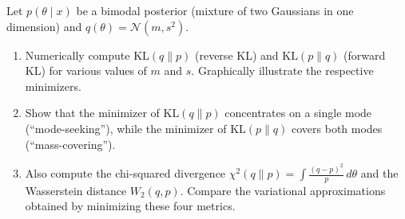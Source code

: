 \begin{exercise}
Let $p(\theta \mid x)$ be a bimodal posterior (mixture of two Gaussians
in one dimension) and $q(\theta) = \mathcal{N}(m, s^2)$.
\begin{enumerate}
  \item Numerically compute $\mathrm{KL}(q \| p)$ (reverse KL) and
        $\mathrm{KL}(p \| q)$ (forward KL) for various values of $m$
        and $s$. Graphically illustrate the respective minimizers.
  \item Show that the minimizer of $\mathrm{KL}(q \| p)$ concentrates
        on a single mode (``mode-seeking''), while the minimizer of
        $\mathrm{KL}(p \| q)$ covers both modes (``mass-covering'').
  \item Also compute the chi-squared divergence
        $\chi^2(q \| p) = \int \frac{(q - p)^2}{p}\,d\theta$ and the
        Wasserstein distance $W_2(q, p)$. Compare the variational
        approximations obtained by minimizing these four metrics.
\end{enumerate}
\end{exercise}
